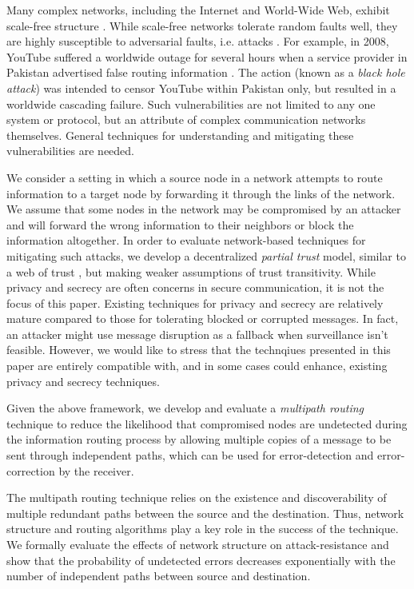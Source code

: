 \documentclass{sig-alternate-05-2015}
\begin{document}
Many complex networks, including the Internet and World-Wide Web, exhibit
scale-free structure
\cite{barabasi_emergence_1999,barabasi_scale-free_2009}.
While scale-free networks tolerate random faults well,
they are highly susceptible to adversarial faults, i.e. attacks
\cite{albert_error_2000}.
For example, in 2008, YouTube suffered a worldwide outage for several hours
when a service provider in Pakistan advertised false routing information
\cite{hunter_pakistan_2008}.
The action (known as a {\em black hole attack}) was intended to censor YouTube
within Pakistan only, but resulted in a worldwide cascading failure.
Such vulnerabilities are not limited to any one system or protocol, but an
attribute of complex communication networks themselves.
General techniques for understanding and mitigating these vulnerabilities are
needed.

We consider a setting in which a source node in a network attempts to route information
to a target node by forwarding it through the links of the network. We 
assume that some nodes in the network may be compromised by an attacker 
and will forward the wrong information to their neighbors or
block the information altogether.
In order to evaluate network-based techniques for mitigating such attacks,
we develop a decentralized {\em partial trust} model,
similar to a web of trust
\cite{zimmermann_official_1995,ferguson_practical_2003},
but making weaker assumptions of trust transitivity.
While privacy and secrecy are often concerns in secure communication,
it is not the focus of this paper.
Existing techniques for privacy and secrecy are relatively mature compared
to those for tolerating blocked or corrupted messages.
In fact, an attacker might use message disruption as a fallback when
surveillance isn't feasible.
However, we would like to stress that the technqiues presented in this paper
are entirely compatible with, and in some cases could enhance, existing
privacy and secrecy techniques.

Given the above framework, we develop and evaluate a \emph{multipath routing} technique to reduce 
the likelihood that compromised nodes are undetected during the information 
routing process by allowing multiple copies of a message to be sent through independent paths,
which can be used for error-detection and error-correction by the receiver. 

The multipath routing technique relies on the existence and discoverability of
multiple redundant paths between the source and the destination. Thus, network 
structure and routing algorithms play a key role in the success of the technique.
We formally evaluate the 
effects of network structure on attack-resistance and show that the probability
of undetected 
errors decreases exponentially with the number of independent paths between 
source and destination.
\end{document}
